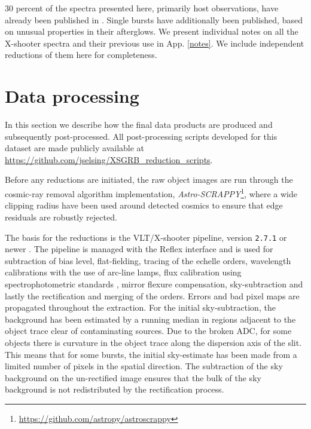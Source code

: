 \documentclass{aa}    %
\begin{document}
30 percent of the spectra presented here, primarily host observations, have
already been published in \citet{Kruhler2015}. Single bursts have additionally
been published, based on unusual properties in their afterglows. We present
individual notes on all the X-shooter spectra and their previous use in App.
\ref{notes}. We include independent reductions of them here for completeness.

\section{Data processing} \label{proc}

In this section we describe how the final data products are produced and
subsequently post-processed. %
All post-processing scripts developed for this dataset are made publicly
available at \url{https://github.com/jselsing/XSGRB_reduction_scripts}.

Before any reductions are initiated, the raw object images are run through the
cosmic-ray removal algorithm \citep{VanDokkum2001} implementation,
\textit{Astro-SCRAPPY}\footnote{\url{https://github.com/astropy/astroscrappy}},
where a wide clipping radius have been used around detected cosmics to ensure that edge residuals are
robustly rejected. 

The basis for the reductions is the VLT/X-shooter pipeline, version
\texttt{2.7.1} or newer \citep{Goldoni2006, Modigliani2010}. The pipeline is
managed with the Reflex interface \citep{Freudling2013} and is used for
subtraction of bias level, flat-fielding, tracing of the echelle orders,
wavelength calibrations with the use of arc-line lamps, flux calibration using
spectrophotometric standards \citep{Vernet2010, Hamuy1994}, mirror flexure
compensation, sky-subtraction and lastly the rectification and merging of the
orders. Errors and bad pixel maps are propagated throughout the extraction. For
the initial sky-subtraction, the background has been estimated by a running
median in regions adjacent to the object trace clear of contaminating sources.
Due to the broken ADC, for some objects there is curvature in the object trace
along the dispersion axis of the slit. This means that for some bursts, the
initial sky-estimate has been made from a limited number of pixels in the
spatial direction. The subtraction of the sky background on the un-rectified
image ensures that the bulk of the sky background is not redistributed by the
rectification process.
\end{document}
